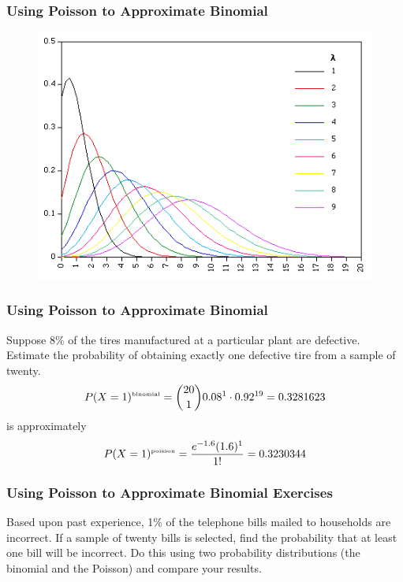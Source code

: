 \documentclass[xcolor=dvipsnames]{beamer}
\begin{document}
\begin{frame}
  \frametitle{Using Poisson to Approximate Binomial}
    \begin{figure}[h]
    \includegraphics[scale=.62]{./diagrams/poisdist.png}
  \end{figure}
\end{frame}

\begin{frame}
  \frametitle{Using Poisson to Approximate Binomial}
   Suppose 8\% of the tires manufactured
  at a particular plant are defective. Estimate the probability of obtaining
  exactly one defective tire from a sample of twenty.
  \begin{equation}
    \label{eq:eikaiche}
    P(X=1)^{\mbox{\tiny binomial}}={20\choose{}1}0.08^{1}\cdot0.92^{19}=0.3281623
  \end{equation}
  is approximately
  \begin{equation}
    \label{eq:aihuroot}
    P(X=1)^{\mbox{\tiny poisson}}=\frac{e^{-1.6}(1.6)^{1}}{1!}=0.3230344
  \end{equation}
\end{frame}

\begin{frame}
  \frametitle{Using Poisson to Approximate Binomial Exercises}
  {\ubung} Based upon past experience, 1\% of the telephone bills
  mailed to households are incorrect. If a sample of twenty bills is
  selected, find the probability that at least one bill will be
  incorrect. Do this using two probability distributions (the binomial
  and the Poisson) and compare your results.
\end{frame}
\end{document}
